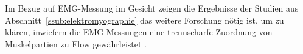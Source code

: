 Im Bezug auf \ac{EMG}-Messung im Gesicht zeigen die Ergebnisse der Studien aus Abschnitt~\ref{ssub:elektromyographie} das weitere Forschung nötig ist, um zu klären, inwiefern die \ac{EMG}-Messungen eine trennscharfe Zuordnung von Muskelpartien zu Flow gewährleistet \citep{Peifer2012}.


